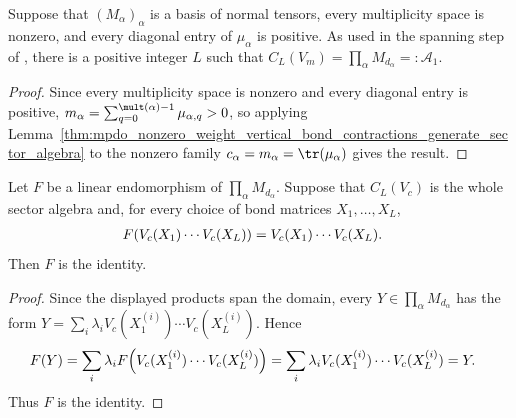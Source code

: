 \begin{lemma}
    \label{thm:mpdo_vertical_bond_contractions_generate_sector_algebra}
    \leanok
    Suppose that $(M_\alpha)_\alpha$ is a basis of normal tensors, every
    multiplicity space is nonzero, and every diagonal entry of $\mu_\alpha$
    is positive. As used in the spanning step of
    \cite[Appendix~C.4, lines~1980--1990]{Cirac2016MPDO_arXiv}, there is a
    positive integer $L$ such that
    $C_L(V_m)=\prod_\alpha M_{d_\alpha}=:\mathcal A_1$.
\end{lemma}

\begin{proof}\leanok
    Since every multiplicity space is nonzero and every diagonal entry is
    positive,
    $m_\alpha
        =\sum_{q=0}^{\mult(\alpha)-1}\mu_{\alpha,q}>0$,
    so applying
    Lemma~\ref{thm:mpdo_nonzero_weight_vertical_bond_contractions_generate_sector_algebra}
    to the nonzero family $c_\alpha=m_\alpha=\tr(\mu_\alpha)$ gives the result.
\end{proof}

\begin{lemma}
    \label{thm:mpdo_fixed_spanning_vertical_contraction_products}
    \leanok
    Let $F$ be a linear endomorphism of
    $\prod_\alpha M_{d_\alpha}$. Suppose that $C_L(V_c)$ is the whole
    sector algebra and, for every choice of bond matrices
    $X_1,\ldots,X_L$,
    \begin{align}
        F(V_c(X_1)\cdots V_c(X_L))
         & =V_c(X_1)\cdots V_c(X_L).
        \notag
    \end{align}
    Then $F$ is the identity.
\end{lemma}

\begin{proof}\leanok
    Since the displayed products span the domain, every
    $Y\in\prod_\alpha M_{d_\alpha}$ has the form
    $Y=\sum_i\lambda_iV_c(X_1^{(i)})\cdots V_c(X_L^{(i)})$. Hence
    \begin{align}
        F(Y)
         & =\sum_i\lambda_i
        F\!\left(V_c(X_1^{(i)})\cdots V_c(X_L^{(i)})\right)
        =\sum_i\lambda_i
        V_c(X_1^{(i)})\cdots V_c(X_L^{(i)})
        =Y.
        \notag
    \end{align}
    Thus $F$ is the identity.
\end{proof}

